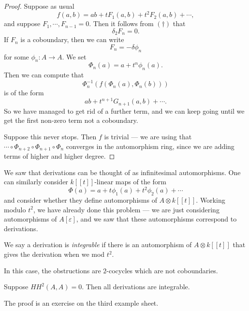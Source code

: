 \documentclass[a4paper]{article}
\newcommand\HH{H\!H}
\begin{document}
\begin{proof}
  Suppose as usual
  \[
    f(a, b) = ab + t F_1(a, b) + t^2 F_2(a, b) + \cdots,
  \]
  and suppose $F_1, \cdots, F_{n - 1} = 0$. Then it follows from $(\dagger)$ that
  \[
    \delta_2 F_n = 0.
  \]
  If $F_n$ is a coboundary, then we can write
  \[
    F_n = - \delta \phi_n
  \]
  for some $\phi_n: A \to A$. We set
  \[
    \Phi_n(a) = a + t^n \phi_n(a).
  \]
  Then we can compute that
  \[
    \Phi_n^{-1}(f (\Phi_n(a), \Phi_n(b)))
  \]
  is of the form
  \[
    ab + t^{n + 1}G_{n + 1}(a, b) + \cdots.
  \]
  So we have managed to get rid of a further term, and we can keep going until we get the first non-zero term not a coboundary.

  Suppose this never stops. Then $f$ is trivial --- we are using that $\cdots \circ \Phi_{n + 2} \circ \Phi_{n + 1} \circ \Phi_n$ converges in the automorphism ring, since we are adding terms of higher and higher degree.
\end{proof}

We saw that derivations can be thought of as infinitesimal automorphisms. One can similarly consider $k[[t]]$-linear maps of the form
\[
  \Phi(a) = a + t \phi_1(a) + t^2 \phi_2(a) + \cdots
\]
and consider whether they define automorphisms of $A \otimes k[[t]]$. Working modulo $t^2$, we have already done this problem --- we are just considering automorphisms of $A[\varepsilon]$, and we saw that these automorphisms correspond to derivations.

\begin{defi}
  We say a derivation is \emph{integrable} if there is an automorphism of $A \otimes k[[t]]$ that gives the derivation when we mod $t^2$.
\end{defi}
In this case, the obstructions are $2$-cocycles which are not coboundaries.

\begin{thm}[Gerstenhaber]
  Suppose $\HH^2(A, A) = 0$. Then all derivations are integrable.
\end{thm}
The proof is an exercise on the third example sheet.
\end{document}
